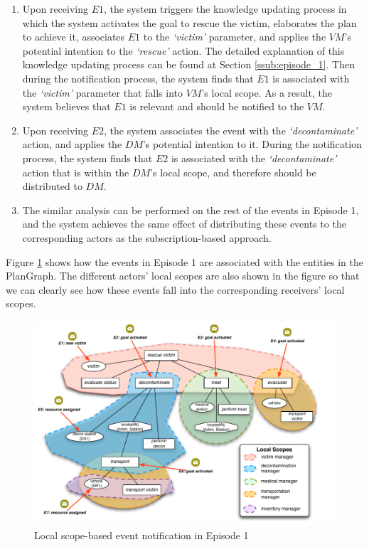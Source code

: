 \begin{enumerate}
	\item Upon receiving $E1$, the system triggers the knowledge updating process in which the system activates the goal to rescue the victim, elaborates the plan to achieve it, associates $E1$ to the \emph{`victim'} parameter, and applies the $VM$'s potential intention to the \emph{`rescue'} action. The detailed explanation of this knowledge updating process can be found at Section \ref{ssub:episode_1}. Then during the notification process, the system finds that $E1$ is associated with the \emph{`victim'} parameter that falls into $VM$'s local scope. As a result, the system believes that $E1$ is relevant and should be notified to the $VM$.
	\item Upon receiving $E2$, the system associates the event with the \emph{`decontaminate'} action, and applies the $DM$'s potential intention to it. During the notification process, the system finds that $E2$ is associated with the \emph{`decontaminate'} action that is within the $DM$'s local scope, and therefore should be distributed to $DM$.
	\item The similar analysis can be performed on the rest of the events in Episode 1, and the system achieves the same effect of distributing these events to the corresponding actors as the subscription-based approach.
\end{enumerate}

Figure \ref{fig:episode_1_ls_distribution} shows how the events in Episode 1 are associated with the entities in the PlanGraph. The different actors' local scopes are also shown in the figure so that we can clearly see how these events fall into the corresponding receivers' local scopes.

\begin{figure}[htbp] %
	\centering
	\includegraphics[width=5.8in]{episode_1_ls_distribution.pdf} 
	\caption{Local scope-based event notification in Episode 1}
	\label{fig:episode_1_ls_distribution}
\end{figure}

